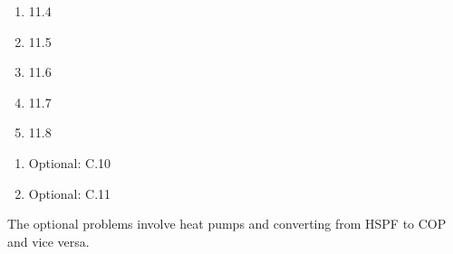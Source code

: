 \documentclass[12pt]{article}
\begin{document}
\begin{enumerate}
\setlength{\itemsep}{-1mm}
\item 11.4
\item 11.5
\item 11.6
\item 11.7
\item 11.8
\end{enumerate}

\begin{enumerate}
\setlength{\itemsep}{-1mm}
\item Optional: C.10 
\item Optional: C.11
\end{enumerate}
\noindent The optional problems involve heat pumps and converting from
HSPF to COP and vice versa. 
\end{document}
